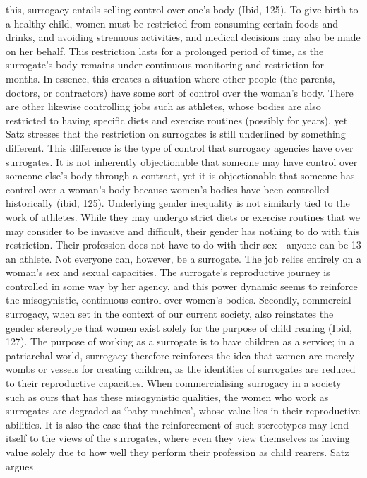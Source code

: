 this, surrogacy entails selling control over one's body (Ibid, 125). To
give birth to a healthy child, women must be restricted from consuming
certain foods and drinks, and avoiding strenuous activities, and medical
decisions may also be made on her behalf. This restriction lasts for a
prolonged period of time, as the surrogate's body remains under
continuous monitoring and restriction for months. In essence, this
creates a situation where other people (the parents, doctors, or
contractors) have some sort of control over the woman's body. There are
other likewise controlling jobs such as athletes, whose bodies are also
restricted to having specific diets and exercise routines (possibly for
years), yet Satz stresses that the restriction on surrogates is still
underlined by something different. This difference is the type of
control that surrogacy agencies have over surrogates. It is not
inherently objectionable that someone may have control over someone
else's body through a contract, yet it is objectionable that someone has
control over a woman's body because women's bodies have been controlled
historically (ibid, 125). Underlying gender inequality is not similarly
tied to the work of athletes. While they may undergo strict diets or
exercise routines that we may consider to be invasive and difficult,
their gender has nothing to do with this restriction. Their profession
does not have to do with their sex - anyone can be 13 an athlete. Not
everyone can, however, be a surrogate. The job relies entirely on a
woman's sex and sexual capacities. The surrogate's reproductive journey
is controlled in some way by her agency, and this power dynamic seems to
reinforce the misogynistic, continuous control over women's bodies.
Secondly, commercial surrogacy, when set in the context of our current
society, also reinstates the gender stereotype that women exist solely
for the purpose of child rearing (Ibid, 127). The purpose of working as
a surrogate is to have children as a service; in a patriarchal world,
surrogacy therefore reinforces the idea that women are merely wombs or
vessels for creating children, as the identities of surrogates are
reduced to their reproductive capacities. When commercialising surrogacy
in a society such as ours that has these misogynistic qualities, the
women who work as surrogates are degraded as `baby machines', whose
value lies in their reproductive abilities. It is also the case that the
reinforcement of such stereotypes may lend itself to the views of the
surrogates, where even they view themselves as having value solely due
to how well they perform their profession as child rearers. Satz argues
